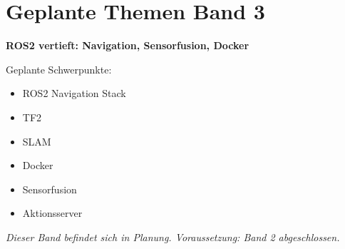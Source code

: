 \chapter*{Geplante Themen Band 3}

\textbf{ROS2 vertieft: Navigation, Sensorfusion, Docker}

\bigskip
Geplante Schwerpunkte:
\begin{itemize}
    \item ROS2 Navigation Stack
    \item TF2
    \item SLAM
    \item Docker
    \item Sensorfusion
    \item Aktionsserver
\end{itemize}

\bigskip
\textit{Dieser Band befindet sich in Planung. Voraussetzung: Band 2 abgeschlossen.}
